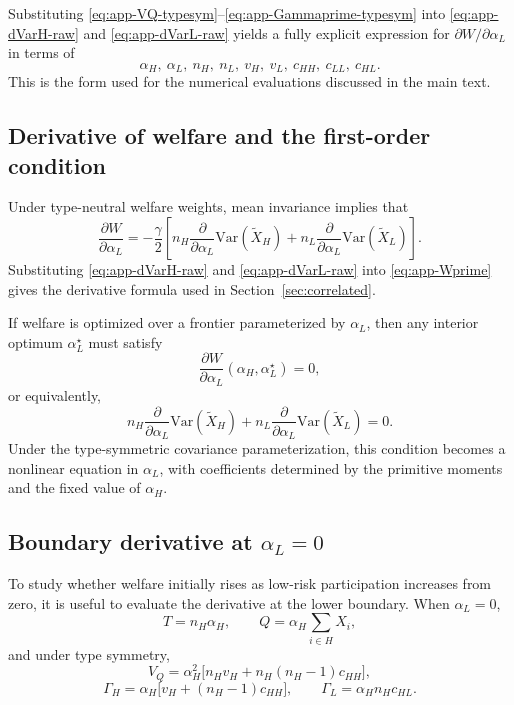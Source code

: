 \documentclass[a4paper,12pt]{article}
\theoremstyle{definition}
\theoremstyle{remark}
\newcommand{\Var}{\mathrm{Var}}
\newcommand{\1}{\mathbf{1}}
\begin{document}
Substituting
\eqref{eq:app-VQ-typesym}--\eqref{eq:app-Gammaprime-typesym} into
\eqref{eq:app-dVarH-raw} and \eqref{eq:app-dVarL-raw} yields a fully explicit
expression for \(\partial W/\partial\alpha_L\) in terms of
\[
\alpha_H,\ \alpha_L,\ n_H,\ n_L,\ v_H,\ v_L,\ c_{HH},\ c_{LL},\ c_{HL}.
\]
This is the form used for the numerical evaluations discussed in the main text.

\subsection{Derivative of welfare and the first-order condition}
\label{app:alphaL-welfare}

Under type-neutral welfare weights, mean invariance implies that
\begin{equation}
\frac{\partial W}{\partial \alpha_L}
=
-\frac{\gamma}{2}
\left[
n_H\frac{\partial}{\partial \alpha_L}\Var(\tilde X_H)
+
n_L\frac{\partial}{\partial \alpha_L}\Var(\tilde X_L)
\right].
\label{eq:app-Wprime}
\end{equation}
Substituting \eqref{eq:app-dVarH-raw} and \eqref{eq:app-dVarL-raw} into
\eqref{eq:app-Wprime} gives the derivative formula used in
Section~\ref{sec:correlated}.

If welfare is optimized over a frontier parameterized by \(\alpha_L\), then any
interior optimum \(\alpha_L^\star\) must satisfy
\begin{equation}
\frac{\partial W}{\partial \alpha_L}(\alpha_H,\alpha_L^\star)=0,
\label{eq:app-FOC}
\end{equation}
or equivalently,
\begin{equation}
n_H\frac{\partial}{\partial \alpha_L}\Var(\tilde X_H)
+
n_L\frac{\partial}{\partial \alpha_L}\Var(\tilde X_L)
=0.
\label{eq:app-FOC-var}
\end{equation}
Under the type-symmetric covariance parameterization, this condition becomes a
nonlinear equation in \(\alpha_L\), with coefficients determined by the
primitive moments and the fixed value of \(\alpha_H\).

\subsection{Boundary derivative at \texorpdfstring{\(\alpha_L=0\)}{alphaL=0}}
\label{app:alphaL-boundary}

To study whether welfare initially rises as low-risk participation increases
from zero, it is useful to evaluate the derivative at the lower boundary. When
\(\alpha_L=0\),
\[
T=n_H\alpha_H,
\qquad
Q=\alpha_H\sum_{i\in H}X_i,
\]
and under type symmetry,
\[
V_Q
=
\alpha_H^2\bigl[n_Hv_H+n_H(n_H-1)c_{HH}\bigr],
\]
\[
\Gamma_H
=
\alpha_H\bigl[v_H+(n_H-1)c_{HH}\bigr],
\qquad
\Gamma_L
=
\alpha_Hn_Hc_{HL}.
\]
\end{document}
